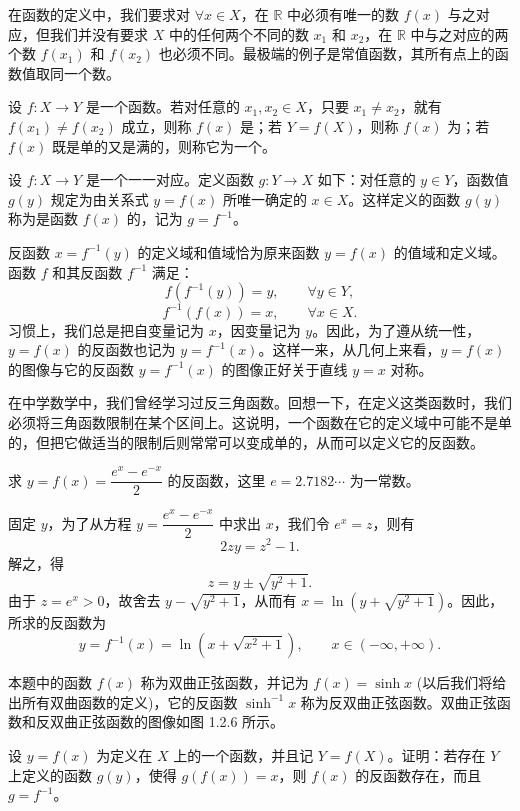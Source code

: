 \documentclass[UTF8,12pt,a4paper,fontset=fandol]{ctexbook}
\begin{document}
\noindent{}

在函数的定义中，我们要求对 $\forall x\in X$，在 $\mathbb{R}$ 中必须有唯一的数 $f(x)$ 与之对应，但我们并没有要求 $X$ 中的任何两个不同的数 $x_1$ 和 $x_2$，在 $\mathbb{R}$ 中与之对应的两个数 $f(x_1)$ 和 $f(x_2)$ 也必须不同。最极端的例子是常值函数，其所有点上的函数值取同一个数。

设 $f:X\to Y$ 是一个函数。若对任意的 $x_1,x_2\in X$，只要 $x_1\ne x_2$，就有 $f(x_1)\ne f(x_2)$ 成立，则称 $f(x)$ 是；若 $Y=f(X)$，则称 $f(x)$ 为；若 $f(x)$ 既是单的又是满的，则称它为一个。

\noindent{}\quad 设 $f:X\to Y$ 是一个一一对应。定义函数 $g:Y\to X$ 如下：对任意的 $y\in Y$，函数值 $g(y)$ 规定为由关系式 $y=f(x)$ 所唯一确定的 $x\in X$。这样定义的函数 $g(y)$ 称为是函数 $f(x)$ 的，记为 $g=f^{-1}$。

反函数 $x=f^{-1}(y)$ 的定义域和值域恰为原来函数 $y=f(x)$ 的值域和定义域。函数 $f$ 和其反函数 $f^{-1}$ 满足：
\[
  f(f^{-1}(y))=y,\qquad \forall y\in Y,
\]
\[
  f^{-1}(f(x))=x,\qquad \forall x\in X.
\]
习惯上，我们总是把自变量记为 $x$，因变量记为 $y$。因此，为了遵从统一性，$y=f(x)$ 的反函数也记为 $y=f^{-1}(x)$。这样一来，从几何上来看，$y=f(x)$ 的图像与它的反函数 $y=f^{-1}(x)$ 的图像正好关于直线 $y=x$ 对称。

在中学数学中，我们曾经学习过反三角函数。回想一下，在定义这类函数时，我们必须将三角函数限制在某个区间上。这说明，一个函数在它的定义域中可能不是单的，但把它做适当的限制后则常常可以变成单的，从而可以定义它的反函数。

\noindent{}\quad 求 $y=f(x)=\dfrac{e^x-e^{-x}}{2}$ 的反函数，这里 $e=2.7182\cdots$ 为一常数。

\noindent{}\quad 固定 $y$，为了从方程 $y=\dfrac{e^x-e^{-x}}{2}$ 中求出 $x$，我们令 $e^x=z$，则有
\[
  2zy=z^2-1.
\]
解之，得
\[
  z=y\pm\sqrt{y^2+1}.
\]
由于 $z=e^x>0$，故舍去 $y-\sqrt{y^2+1}$，从而有 $x=\ln(y+\sqrt{y^2+1})$。因此，所求的反函数为
\[
  y=f^{-1}(x)=\ln(x+\sqrt{x^2+1}),\qquad x\in(-\infty,+\infty).
\]

本题中的函数 $f(x)$ 称为双曲正弦函数，并记为 $f(x)=\sinh x$ (以后我们将给出所有双曲函数的定义)，它的反函数 $\sinh^{-1}x$ 称为反双曲正弦函数。双曲正弦函数和反双曲正弦函数的图像如图 1.2.6 所示。

\noindent{}\quad 设 $y=f(x)$ 为定义在 $X$ 上的一个函数，并且记 $Y=f(X)$。证明：若存在 $Y$ 上定义的函数 $g(y)$，使得 $g(f(x))=x$，则 $f(x)$ 的反函数存在，而且 $g=f^{-1}$。
\end{document}
